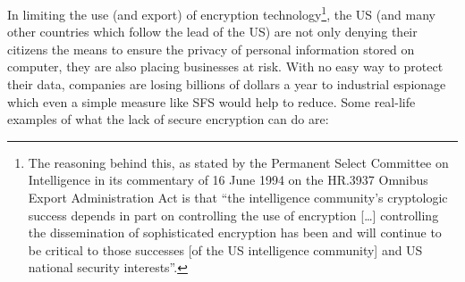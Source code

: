 In limiting the use (and export) of encryption technology\footnote{
               The reasoning behind this, as stated by the Permanent Select
               Committee on Intelligence in its commentary of 16 June 1994 on
               the HR.3937 Omnibus Export Administration Act is that ``the
               intelligence community's cryptologic success depends in part on
               controlling the use of encryption [\dots] controlling the
               dissemination of sophisticated encryption has been and will
               continue to be critical to those successes [of the US
               intelligence community] and US national security interests''.
}, the US (and many
other countries which follow the lead of the US) are not only denying their
citizens the means to ensure the privacy of personal information stored on
computer, they are also placing businesses at risk.  With no easy way to
protect their data, companies are losing billions of dollars a year to
industrial espionage which even a simple measure like SFS would help to reduce.
Some real-life examples of what the lack of secure encryption can do are:

